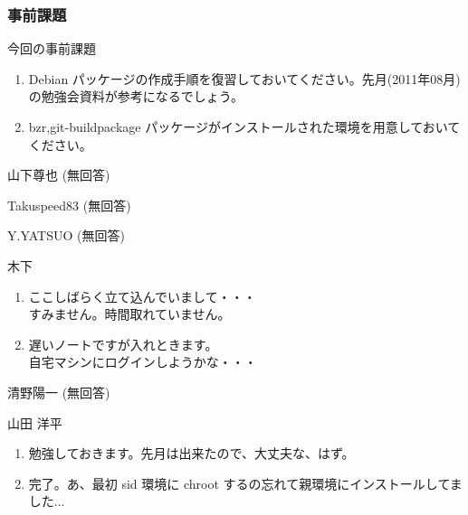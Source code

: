 \documentclass[cjk,dvipdfmx,12pt,%
hyperref={bookmarks=true,bookmarksnumbered=true,bookmarksopen=false,%
colorlinks=false,%
pdftitle={第 51 回 関西 Debian 勉強会},%
pdfauthor={倉敷・のがた・佐々木},%
pdfsubject={資料},%
}]{beamer}
\begin{document}


\begin{frame}[fragile]
\frametitle{事前課題}

\begin{block}{今回の事前課題}
\begin{enumerate}
\item Debian パッケージの作成手順を復習しておいてください。先月(2011年08月)の勉強会資料が参考になるでしょう。
\item {bzr,git}-buildpackage パッケージがインストールされた環境を用意しておいてください。
\end{enumerate}

\end{block}
\end{frame}


\begin{frame}{ 山下尊也 }
(無回答)
\end{frame}

\begin{frame}{ Takuspeed83 }
(無回答)
\end{frame}

\begin{frame}{ Y.YATSUO }
(無回答)
\end{frame}

\begin{frame}{ 木下 }
\begin{enumerate}
\item ここしばらく立て込んでいまして・・・\\
すみません。時間取れていません。
\item 遅いノートですが入れときます。\\
自宅マシンにログインしようかな・・・
\end{enumerate}
\end{frame}

\begin{frame}{  清野陽一 }
(無回答)
\end{frame}

\begin{frame}{ 山田 洋平 }
\begin{enumerate}
\item 勉強しておきます。先月は出来たので、大丈夫な、はず。
\item 完了。あ、最初 sid 環境に chroot するの忘れて親環境にインストールしてました...
\end{enumerate}
\end{frame}
\end{document}
